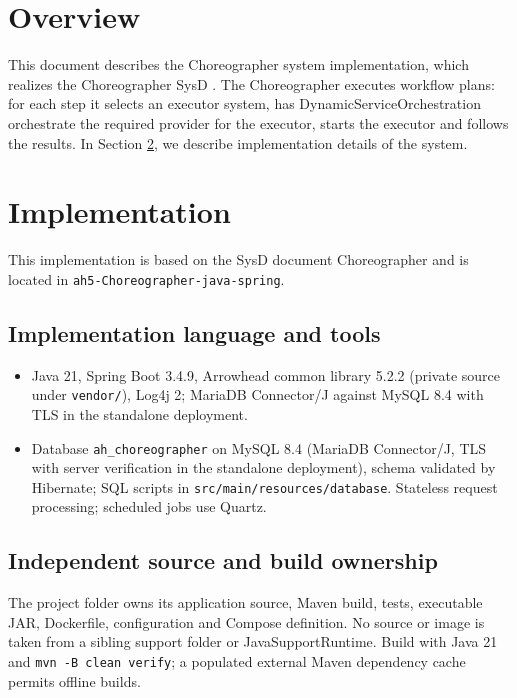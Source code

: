 \documentclass[a4paper]{arrowhead}
\begin{document}
\section{Overview}
\label{sec:overview}

This document describes the Choreographer system implementation, which realizes the Choreographer SysD \cite{cho-sysd}. The Choreographer executes workflow plans: for each step it selects an executor system, has Dynamic\allowbreak{}Service\allowbreak{}Orchestration orchestrate the required provider for the executor, starts the executor and follows the results.
In Section \ref{Implementation}, we describe implementation details of the system.

\newpage

\section{Implementation}
\label{Implementation}

This implementation is based on the SysD document Choreographer \cite{cho-sysd} and is located in \texttt{ah5-Choreographer-java-spring}.

\subsection{Implementation language and tools}
\begin{itemize}
\item Java 21, Spring Boot 3.4.9, Arrowhead common library 5.2.2 (private source under \texttt{vendor/}), Log4j 2; MariaDB Connector/J against MySQL 8.4 with TLS in the standalone deployment.
\item Database \texttt{ah\_\allowbreak{}choreographer} on MySQL 8.4 (MariaDB Connector/J, TLS with server verification in the standalone deployment), schema validated by Hibernate; SQL scripts in \texttt{src/\allowbreak{}main/\allowbreak{}resources/\allowbreak{}database}. Stateless request processing; scheduled jobs use Quartz.
\end{itemize}

\subsection{Independent source and build ownership}
The project folder owns its application source, Maven build, tests, executable JAR, Dockerfile, configuration and Compose definition. No source or image is taken from a sibling support folder or JavaSupportRuntime. Build with Java 21 and \texttt{mvn -B clean verify}; a populated external Maven dependency cache permits offline builds.
\end{document}
